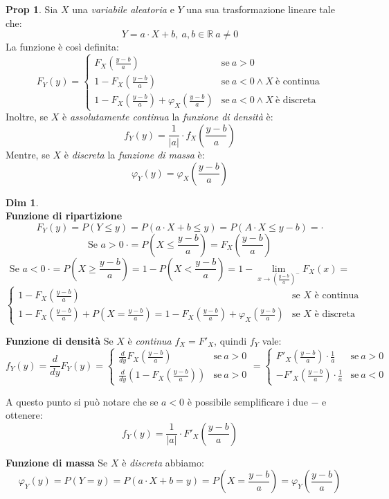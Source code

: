 \documentclass[12pt, a4paper]{report}
\theoremstyle{definition}
\newtheorem*{demonstration}{Dim}
\newtheorem*{proposition}{Prop}
\DeclareRobustCommand{\R}{\mathbb{R}}%
\begin{document}
\begin{proposition}
	Sia $X$ una \emph{variabile aleatoria} e $Y$ una sua trasformazione lineare
	tale che:
	\[Y=a\cdot X+b,\ a,b\in\R\ a\neq 0\]
	La funzione è così definita:
	\[F_Y(y)=\begin{cases}
		{F_X\left(\frac{y-b}{a}\right)} & \text{se}\ {a>0}\\
		{1-F_X\left(\frac{y-b}{a}\right)} & \text{se}\ {a<0\wedge X\ \text{è continua}}\\
		{1-F_X\left(\frac{y-b}{a}\right)+\varphi_X\left(\frac{y-b}{a}\right)} & 
		\text{se}\ {a<0\wedge X\ \text{è discreta}}
	\end{cases}\]
	Inoltre, se $X$ è \emph{assolutamente continua} la \emph{funzione di densità}
	è:
	\[f_Y(y)=\frac{1}{|a|}\cdot f_X\left(\frac{y-b}{a}\right)\]
	Mentre, se $X$ è \emph{discreta} la \emph{funzione di massa} è:
	\[\varphi_Y(y)=\varphi_X\left(\frac{y-b}{a}\right)\]
\end{proposition}
\begin{demonstration}
	\mbox{}\\
	\textbf{Funzione di ripartizione}
	\[F_Y(y)=P(Y\leq y)=P(a\cdot X+b\leq y)=P(A\cdot X\leq y-b)=\cdot \]
	\[\text{Se $a>0$}\ \cdot =P\left(X\leq\frac{y-b}{a}\right)=F_X\left(\frac{y-b}{a}\right)\]
	\[\text{Se $a<0$}\ \cdot =P\left(X\geq\frac{y-b}{a}\right)=1-P\left(X<\frac{y-b}{a}
	\right)=1-\lim_{x\rightarrow(\frac{y-b}{a})^-}F_X(x)=\]
	\[\begin{cases}
		{1-F_X\left(\frac{y-b}{a}\right)} & \text{se $X$ è continua}\\
		{1-F_X\left(\frac{y-b}{a}\right)+P\left(X=\frac{y-b}{a}\right)=1-F_X
		\left(\frac{y-b}{a}\right)+\varphi_X\left(\frac{y-b}{a}\right)} & \text{se
		$X$ è discreta}
	\end{cases}\]

	\noindent
	\textbf{Funzione di densità}
	Se $X$ è \emph{continua} \(f_X=F'_X\), quindi $f_Y$ vale:
	\[f_Y(y)=\frac{d}{dy}F_Y(y)=\begin{cases}
		{\frac{d}{dy}F_X\left(\frac{y-b}{a}\right)} & \text{se}\ {a>0}\\
		{\frac{d}{dy}\left(1-F_X\left(\frac{y-b}{a}\right)\right)} & \text{se}\ {a>0}
	\end{cases}=\begin{cases}
		{F'_X\left(\frac{y-b}{a}\right)\cdot \frac{1}{a}} & \text{se}\ {a>0}\\
		{-F'_X\left(\frac{y-b}{a}\right)\cdot \frac{1}{a}} & \text{se}\ {a<0}
	\end{cases}\]

	A questo punto si può notare che se $a<0$ è possibile semplificare i due $-$
	e ottenere:
	\[f_Y(y)=\frac{1}{|a|}\cdot F'_X\left(\frac{y-b}{a}\right)\]

	\noindent
	\textbf{Funzione di massa}
	Se $X$ è \emph{discreta} abbiamo:
	\[\varphi_Y(y)=P(Y=y)=P(a\cdot X+b=y)=P\left(X=\frac{y-b}{a}\right)=\varphi_Y
	\left(\frac{y-b}{a}\right)\]
\end{demonstration}
\end{document}
